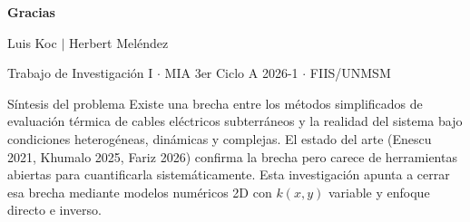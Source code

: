 \documentclass[aspectratio=169]{beamer}
\begin{document}
\begin{frame}
\centering
{\Large \textbf{Gracias}}

\vspace{0.8em}
\large Luis Koc \quad $|$ \quad Herbert Meléndez

\vspace{0.4em}
\normalsize Trabajo de Investigación I $\cdot$ MIA 3er Ciclo A 2026-1 $\cdot$ FIIS/UNMSM

\vspace{0.6em}
\begin{block}{\centering Síntesis del problema}
\centering\small
Existe una brecha entre los métodos simplificados de evaluación térmica de cables
eléctricos subterráneos y la realidad del sistema bajo condiciones heterogéneas,
dinámicas y complejas. El estado del arte (Enescu 2021, Khumalo 2025, Fariz 2026)
confirma la brecha pero carece de herramientas abiertas para cuantificarla
sistemáticamente. Esta investigación apunta a cerrar esa brecha mediante modelos
numéricos 2D con $k(x,y)$ variable y enfoque directo e inverso.
\end{block}
\end{frame}
\end{document}
